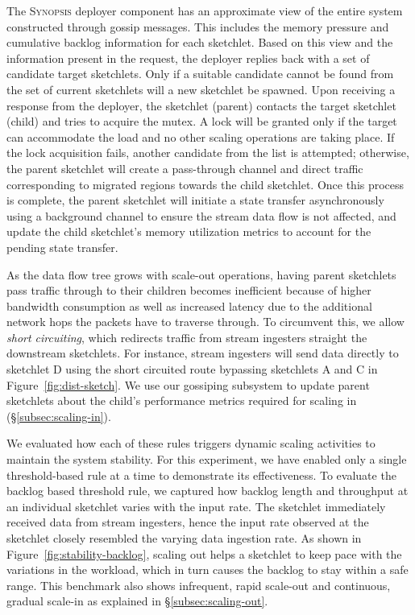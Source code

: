 \documentclass[9pt,journal,compsoc]{IEEEtran}
\begin{document}
%
The \textsc{Synopsis} deployer component has an approximate view of the entire system constructed through gossip messages. This includes the memory pressure and cumulative backlog information for each sketchlet.
Based on this view and the information present in the request, the deployer replies back with a set of candidate target sketchlets.
Only if a suitable candidate cannot be found from the set of current sketchlets will a new sketchlet be spawned.
Upon receiving a response from the deployer, the sketchlet (parent) contacts the target sketchlet (child) and tries to acquire the mutex.
A lock will be granted only if the target can accommodate the load and no other scaling operations are taking place.
If the lock acquisition fails, another candidate from the list is attempted; otherwise, the parent sketchlet will create a pass-through channel and direct traffic corresponding to migrated regions towards the child sketchlet.
Once this process is complete, the parent sketchlet will initiate a state transfer asynchronously using a background channel to ensure the stream data flow is not affected, and update the child sketchlet's memory utilization metrics to account for the pending state transfer.

As the data flow tree grows with scale-out operations, having parent sketchlets pass traffic through to their children becomes inefficient because of higher bandwidth consumption as well as increased latency due to the additional network hops the packets have to traverse through.
To circumvent this, we allow \emph{short circuiting}, which redirects traffic from stream ingesters straight the downstream sketchlets.
For instance, stream ingesters will send data directly to sketchlet D using the short circuited route bypassing sketchlets A and C in Figure~\ref{fig:dist-sketch}. 
We use our gossiping subsystem to update parent sketchlets about the child's performance metrics required for scaling in (\S\ref{subsec:scaling-in}).

We evaluated how each of these rules triggers dynamic scaling activities to maintain the system stability.
For this experiment, we have enabled only a single threshold-based rule at a time to demonstrate its effectiveness.
To evaluate the backlog based threshold rule, we captured how backlog length and throughput at an individual sketchlet varies with the input rate.
The sketchlet immediately received data from stream ingesters, hence the input rate observed at the sketchlet closely resembled the varying data ingestion rate.
As shown in Figure~\ref{fig:stability-backlog}, scaling out helps a sketchlet to keep pace with the variations in the workload, which in turn causes the backlog to stay within a safe range.
This benchmark also shows infrequent, rapid scale-out and continuous, gradual scale-in as explained in \S\ref{subsec:scaling-out}.
\end{document}
